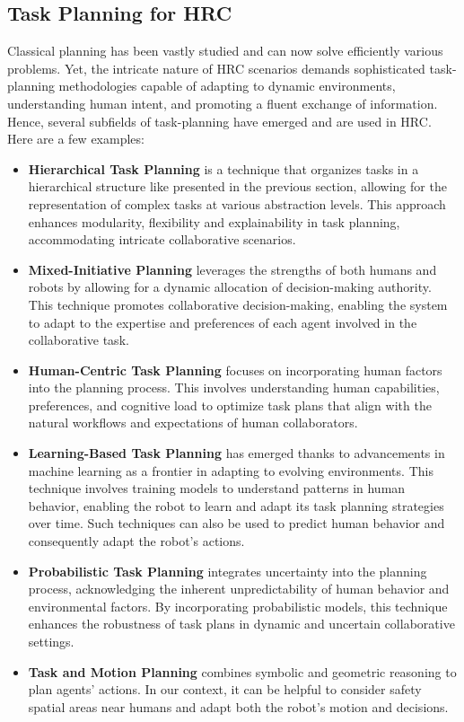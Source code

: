 \subsection{Task Planning for HRC}

Classical planning has been vastly studied and can now solve efficiently various problems. Yet, the intricate nature of HRC scenarios demands sophisticated task-planning methodologies capable of adapting to dynamic environments, understanding human intent, and promoting a fluent exchange of information. Hence, several subfields of task-planning have emerged and are used in HRC. Here are a few examples:

\begin{itemize}
    \item \textbf{Hierarchical Task Planning} is a technique that organizes tasks in a hierarchical structure like presented in the previous section, allowing for the representation of complex tasks at various abstraction levels. This approach enhances modularity, flexibility and explainability in task planning, accommodating intricate collaborative scenarios.
    
    \item \textbf{Mixed-Initiative Planning} leverages the strengths of both humans and robots by allowing for a dynamic allocation of decision-making authority. This technique promotes collaborative decision-making, enabling the system to adapt to the expertise and preferences of each agent involved in the collaborative task.
    
    \item \textbf{Human-Centric Task Planning} focuses on incorporating human factors into the planning process. This involves understanding human capabilities, preferences, and cognitive load to optimize task plans that align with the natural workflows and expectations of human collaborators.
    
    \item \textbf{Learning-Based Task Planning} has emerged thanks to advancements in machine learning as a frontier in adapting to evolving environments. This technique involves training models to understand patterns in human behavior, enabling the robot to learn and adapt its task planning strategies over time. Such techniques can also be used to predict human behavior and consequently adapt the robot's actions.
    
    \item \textbf{Probabilistic Task Planning} integrates uncertainty into the planning process, acknowledging the inherent unpredictability of human behavior and environmental factors. By incorporating probabilistic models, this technique enhances the robustness of task plans in dynamic and uncertain collaborative settings.
    
    \item \textbf{Task and Motion Planning} combines symbolic and geometric reasoning to plan agents' actions. In our context, it can be helpful to consider safety spatial areas near humans and adapt both the robot's motion and decisions. 
    
\end{itemize}


